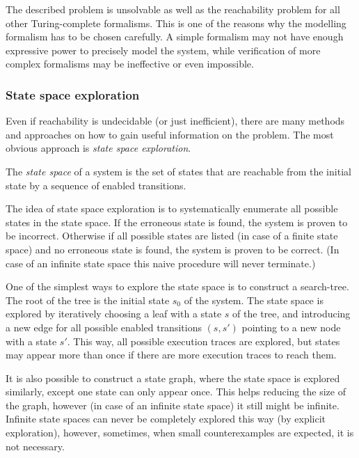 The described problem is unsolvable as well as the reachability problem for all other Turing-complete formalisms. This is one of the reasons why the modelling formalism has to be chosen carefully. A simple formalism may not have enough expressive power to precisely model the system, while verification of more complex formalisms may be ineffective or even impossible.

\subsubsection{State space exploration}

Even if reachability is undecidable (or just inefficient), there are many methods and approaches on how to gain useful information on the problem. The most obvious approach is \emph{state space exploration}.

\begin{dfn}
	The \emph{state space} of a system is the set of states that are reachable from the initial state by a sequence of enabled transitions. 
\end{dfn}

The idea of state space exploration is to systematically enumerate all possible states in the state space. If the erroneous state is found, the system is proven to be incorrect. Otherwise if all possible states are listed (in case of a finite state space) and no erroneous state is found, the system is proven to be correct. (In case of an infinite state space this naive procedure will never terminate.)

One of the simplest ways to explore the state space is to construct a search-tree. The root of the tree is the initial state $s_0$ of the system. The state space is explored by iteratively choosing a leaf with a state $s$ of the tree, and introducing a new edge for all possible enabled transitions $(s,s')$ pointing to a new node with a state $s'$. This way, all possible execution traces are explored, but states may appear more than once if there are more execution traces to reach them.

It is also possible to construct a state graph, where the state space is explored similarly, except one state can only appear once. This helps reducing the size of the graph, however (in case of an infinite state space) it still might be infinite. Infinite state spaces can never be completely explored this way (by explicit exploration), however, sometimes, when small counterexamples are expected, it is not necessary.

